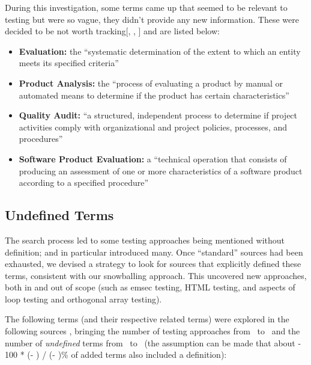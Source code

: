 \ifnotpaper
      During this investigation, some terms came up that seemed to be relevant to
      testing but were so vague, they didn't provide any new information. These were
      decided to be not worth tracking[, ,
            ] and are listed below:

      \begin{itemize}
            \item \textbf{Evaluation:} the ``systematic determination of the extent
                  to which an entity meets its specified criteria''
                  \citep[p.~167]{IEEE2017}
            \item \textbf{Product Analysis:} the ``process of evaluating a product by
                  manual or automated means to determine if the product has certain
                  characteristics'' \citep[p.~343]{IEEE2017}
            \item \textbf{Quality Audit:} ``a structured, independent process to
                  determine if project activities comply with organizational and
                  project policies, processes, and procedures'' \citep[p.~361]{IEEE2017}
            \item \textbf{Software Product Evaluation:} a ``technical operation that
                  consists of producing an assessment of one or more characteristics
                  of a software product according to a specified procedure''
                  \citep[p.~424]{IEEE2017}
      \end{itemize}
\fi

\subsection{Undefined Terms}
\label{undef-terms}


\newcount\TotalBefore
\newcount\TotalAfter
\newcount\UndefBefore
\newcount\UndefAfter



The search process led to some testing approaches being
mentioned without definition;
\citep{IEEE2022} and \citep{Firesmith2015} in particular introduced many.
Once ``standard'' sources had been exhausted, we devised a strategy to
look for sources that explicitly defined these terms, consistent with
our snowballing approach. This uncovered new approaches, both in and out of
scope (such as \acf{emsec} testing, HTML testing, and aspects of loop testing and
orthogonal array testing).

The following terms (and their respective related terms)
were explored%
\ifnotpaper
      { in the following sources}%
\fi, bringing the number of testing
approaches from \the\TotalBefore~to \the\TotalAfter~and the number of
\emph{undefined} terms from \the\UndefBefore~to \the\UndefAfter~(the assumption
can be made that about \the{} - 100 * (\UndefAfter - \UndefBefore) /
(\TotalAfter - \TotalBefore)\relax\% of added terms also included a definition):


